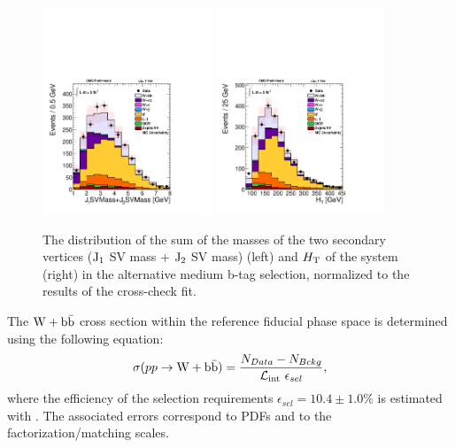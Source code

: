 \begin{figure}
\centering
\includegraphics[width=0.45\textwidth]{Wbb/fig3a.pdf}
\includegraphics[width=0.45\textwidth]{Wbb/fig4a.pdf}
\caption{
The distribution of the sum of the masses of the two secondary vertices ($\rm{J_1}$ SV mass + $\rm{J_2}$ SV mass) (left)  and $H_{\rm{T}}$ of the system (right) in the alternative
medium b-tag selection, 
normalized to the results of the cross-check fit. 
}
\label{fig:figC}
\end{figure}

The $\mathrm{W+\mathrm{b\bar{b}}}$ cross section within the reference fiducial phase space
is determined using the following equation:
\begin{equation*} 
\sigma(pp\rightarrow \mathrm{W+\mathrm{b\bar{b}}}) = \frac{N_{Data}-N_{Bckg}}{{\cal L}_{\mathrm{int}}~\epsilon_{sel}},
\nonumber
\end{equation*}
where the efficiency of the selection requirements $\epsilon_{sel} = 10.4 \pm 1.0\%$
is estimated with \MADGRAPH. The associated errors correspond to PDFs and to the factorization/matching scales.

